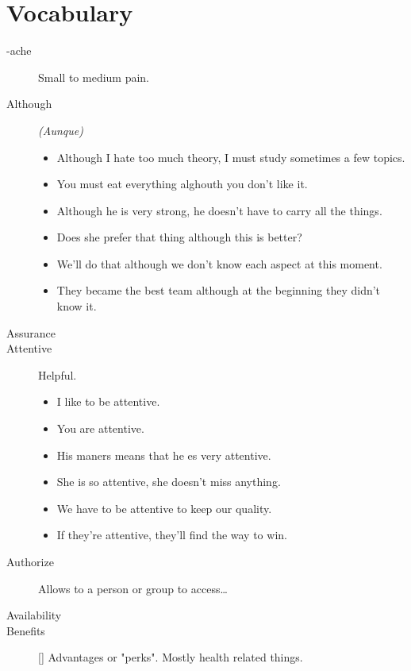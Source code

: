 \section{Vocabulary}
\begin{multicols}{2}
\begin{description}

\item[-ache] Small to medium pain.

\item[Although] \emph{(Aunque)}
\begin{itemize}
\item Although I hate too much theory, I must study sometimes a few topics.
\item You must eat everything alghouth you don't like it.
\item Although he is very strong, he doesn't have to carry all the things.
\item Does she prefer that thing although this is better?
\item We'll do that although we don't know each aspect at this moment.
\item They became the best team although at the beginning they didn't know it.
\end{itemize}

\item[Assurance]

\item[Attentive] Helpful.
\begin{itemize}
\item I like to be attentive.
\item You are attentive.
\item His maners means that he es very attentive.
\item She is so attentive, she doesn't miss anything.
\item We have to be attentive to keep our quality.
\item If they're attentive, they'll find the way to win.
\end{itemize}

\item[Authorize] Allows to a person or group to access\dots

\item[Availability]

\item[Benefits] [\emph{}] Advantages or "perks". Mostly health related things.


\end{description}
\end{multicols}
